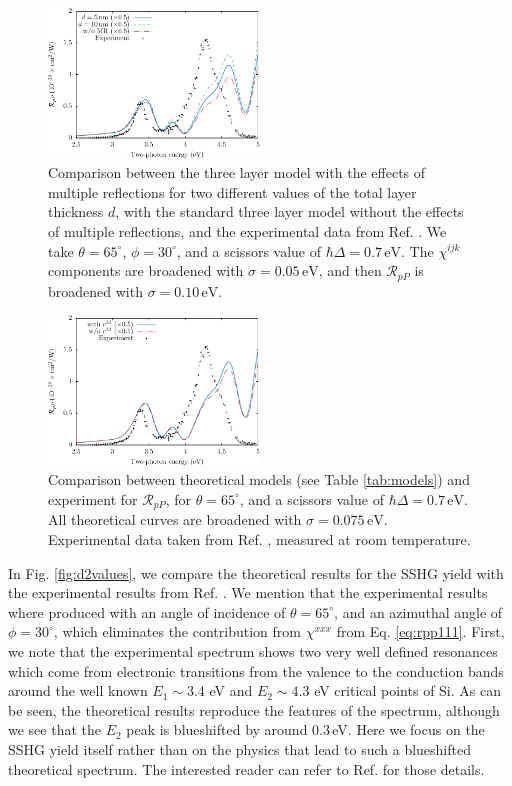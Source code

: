 \begin{figure}[H]
\centering
\includegraphics[width=0.5\textwidth]{content/figures/fig-Si1x1-MRthickness}
\caption{Comparison between the three layer model with the effects of multiple reflections for two different values of the total layer thickness $d$, with the standard three layer model without the effects of multiple reflections, and the experimental data from Ref. \cite{mejiaPRB02}. We take $\theta=65^{\circ}$, $\phi=30^{\circ}$, and a scissors value of $\hbar\Delta = 0.7\,\text{eV}$. The $\chi^{ijk}$ components are broadened with $\sigma=0.05\,\text{eV}$, and then $\mathcal{R}_{pP}$ is broadened with $\sigma=0.10\,\text{eV}$.}
\label{fig:average}
\end{figure}

\begin{figure}[H]
\centering
\includegraphics[width=0.5\textwidth]{content/figures/fig-Si1x1-MRno1w}
\caption{Comparison between theoretical models (see Table
\ref{tab:models}) and experiment for $\mathcal{R}_{pP}$, for
$\theta=65^{\circ}$, and a scissors value of $\hbar\Delta = 0.7\,\text{eV}$.
All theoretical curves are broadened with $\sigma=0.075\,\text{eV}$.
Experimental data taken from Ref. \cite{mitchellSS01}, measured at room
temperature.}
\label{fig:mr2}
\end{figure}

In Fig. \ref{fig:d2values}, we compare the theoretical results for the SSHG yield with the experimental results from Ref. \cite{mejiaPRB02}. We mention that the experimental results where produced with an angle of incidence of $\theta=65^\circ$, and an azimuthal angle of $\phi=30^\circ$, which eliminates the contribution from $\chi^{xxx}$ from Eq. \eqref{eq:rpp111}. First, we note that the experimental spectrum shows two very well defined resonances which come from electronic transitions from the valence to the conduction bands around the well known $E_{1}\sim 3.4$ eV and $E_{2}\sim 4.3$ eV critical points of Si.\cite{yubook} As can be seen, the theoretical results reproduce the features of the spectrum, although we see that the $E_{2}$ peak is blueshifted by around 0.3\,eV. Here we focus on the SSHG yield itself rather than on the physics that lead to such a blueshifted theoretical spectrum. The interested reader can refer to Ref. \cite{andersonPRB16} for those details.

